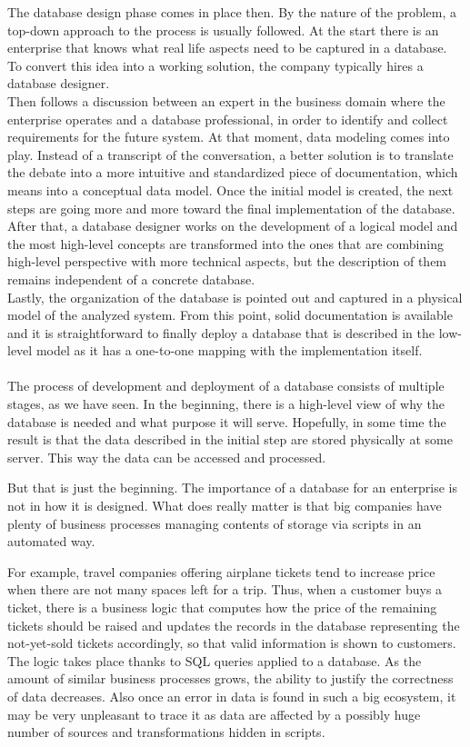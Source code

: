 The database design phase comes in place then. By the nature of the problem, a top-down approach to the process is usually followed. At the start there is an enterprise that knows what real life aspects need to be captured in a database. To convert this idea into a working solution, the company typically hires a database designer. \\

Then follows a discussion between an expert in the business domain where the enterprise operates and a database professional, in order to identify and collect requirements for the future system.
At that moment, data modeling comes into play. 
Instead of a transcript of the conversation, a better solution is to translate the debate into a more intuitive and standardized piece of documentation, which means into a conceptual data model.
Once the initial model is created, the next steps are going more and more toward the final implementation of the database. After that, a database designer works on the development of a logical model and the most high-level concepts are transformed into the ones that are combining high-level perspective with more technical aspects, but the description of them remains independent of a concrete database. \\

Lastly, the organization of the database is pointed out and captured in a physical model of the analyzed system. From this point, solid documentation is available and it is straightforward to finally deploy a database that is described in the low-level model as it has a one-to-one mapping with the implementation itself. \\ \\

The process of development and deployment of a database consists of multiple stages, as we have seen. In the beginning, there is a high-level view of why the database is needed and what purpose it will serve. Hopefully, in some time the result is that the data described in the initial step are stored physically at some server. 
This way the data can be accessed and processed.

But that is just the beginning. The importance of a database for an enterprise is not in how it is designed. What does really matter is that big companies have plenty of business processes managing contents of storage via scripts in an automated way. 

For example, travel companies offering airplane tickets tend to increase price when there are not many spaces left for a trip. 
Thus, when a customer buys a ticket, there is a business logic that computes how the price of the remaining tickets should be raised and updates the records in the database representing the not-yet-sold tickets accordingly, so that valid information is shown to customers.
The logic takes place thanks to SQL queries applied to a database.
As the amount of similar business processes grows, the ability to justify the correctness of data decreases. 
Also once an error in data is found in such a big ecosystem, it may be very unpleasant to trace it as data are affected by a possibly huge number of sources and transformations hidden in scripts.

